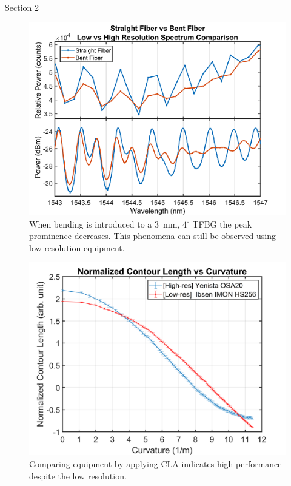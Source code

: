 \documentclass[final]{beamer}
\newlength{\onecolwid}
\begin{document}
\begin{frame}[t]
\begin{columns}[t]
\begin{column}{\onecolwid}
\begin{block}{Section 2}
\end{block}
\vspace{-0.3in}

\begin{figure}
\includegraphics[width=1\linewidth]{Images/bending_spectrum_v4_HD_v2_LQ.png}
\caption{When bending is introduced to a \SI{3}{\milli\metre}, $4^{\circ}$ TFBG the peak prominence decreases. This phenomena can still be observed using low-resolution equipment.}
\end{figure}
\vspace{-0.3in}

\begin{figure}
\includegraphics[width=1\linewidth]{Images/contour_len_curvature_HD_v3.png} 
\caption{Comparing equipment by applying CLA indicates high performance despite the low resolution.}
\end{figure}
\vspace{-0.3in}


\end{column}
\end{columns}
\end{frame}
\end{document}
